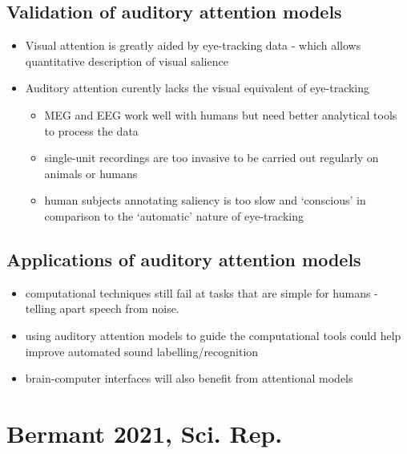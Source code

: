 \documentclass[
]{book}
\providecommand{\tightlist}{%
  \setlength{\itemsep}{0pt}\setlength{\parskip}{0pt}}
\begin{document}
\hypertarget{validation-of-auditory-attention-models}{%
\section{Validation of auditory attention models}\label{validation-of-auditory-attention-models}}

\begin{itemize}
\tightlist
\item
  Visual attention is greatly aided by eye-tracking data - which allows quantitative description of visual salience
\item
  Auditory attention curently lacks the visual equivalent of eye-tracking

  \begin{itemize}
  \tightlist
  \item
    MEG and EEG work well with humans but need better analytical tools to process the data
  \item
    single-unit recordings are too invasive to be carried out regularly on animals or humans
  \item
    human subjects annotating saliency is too slow and `conscious' in comparison to the `automatic' nature of eye-tracking
  \end{itemize}
\end{itemize}

\hypertarget{applications-of-auditory-attention-models}{%
\section{Applications of auditory attention models}\label{applications-of-auditory-attention-models}}

\begin{itemize}
\tightlist
\item
  computational techniques still fail at tasks that are simple for humans - telling apart speech from noise.
\item
  using auditory attention models to guide the computational tools could help improve automated sound labelling/recognition
\item
  brain-computer interfaces will also benefit from attentional models
\end{itemize}

\hypertarget{bermant-2021-sci.-rep.}{%
\chapter{Bermant 2021, Sci. Rep.}\label{bermant-2021-sci.-rep.}}
\end{document}
